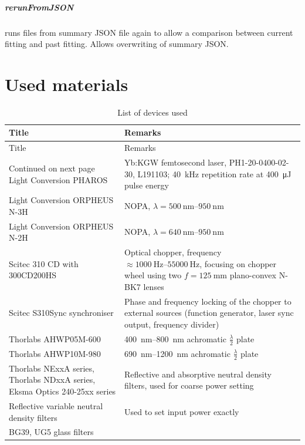 \documentclass[twoside,openright]{scrreprt}
\begin{document}
\paragraph{rerunFromJSON} runs files from summary JSON file again to allow a comparison between current fitting and past fitting. Allows overwriting of summary JSON.

\let\cleardoublepage\clearpage
\chapter*{Used materials}
\begin{longtable}{p{}p{}}
    \caption{List of devices used}
    \label{tab:devices} \\
    \toprule 
    Title & Remarks \\
    \midrule
    \endfirsthead
    \toprule 
    Title & Remarks \\
    \midrule
    \endhead
    \midrule
    Continued on next page
    \endfoot
    \bottomrule
    \endlastfoot
    Light Conversion PHAROS & Yb:KGW femtosecond laser, PH1-20-0400-02-30, L191103; \SI{40}{\kilo\hertz} repetition rate at \SI{400}{\micro\joule} pulse energy \\
    Light Conversion ORPHEUS N-3H & NOPA, $ \lambda = \SIrange{500}{950}{\nano\meter} $ \\
    Light Conversion ORPHEUS N-2H & NOPA, $ \lambda = \SIrange{640}{950}{\nano\meter} $ \\
    Scitec 310 CD with 300CD200HS & Optical chopper, frequency $\approx \SIrange{1000}{55000}{\hertz}$, focusing on chopper wheel using two $f=\SI{125}{\milli\meter}$ plano-convex N-BK7 lenses \\
    Scitec S310Sync synchroniser & Phase and frequency locking of the chopper to external sources (function generator, laser sync output, frequency divider) \\
    Thorlabs AHWP05M-600 & \SIrange{400}{800}{\nano\meter} achromatic $\frac{\lambda}{2}$ plate \\
    Thorlabs AHWP10M-980 & \SIrange{690}{1200}{\nano\meter} achromatic $\frac{\lambda}{2}$ plate \\
    Thorlabs NExxA series, Thorlabs NDxxA series, Eksma Optics 240-25xx series & Reflective and absorptive neutral density filters, used for coarse power setting \\
    Reflective variable neutral density filters & Used to set input power exactly \\
    BG39, UG5 glass filters \\

\end{longtable}
\end{document}

